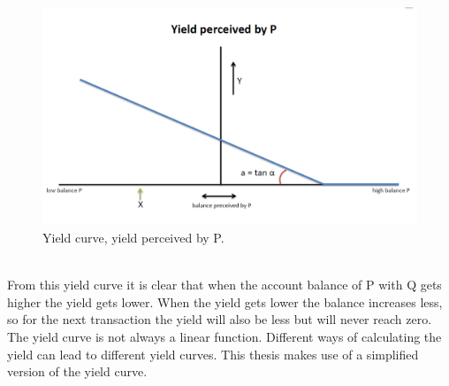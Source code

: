 \documentclass[twoside,openright]{uva-bachelor-thesis}
\begin{document}
\\
\begin{figure}[h!]
   \centering
    \includegraphics[scale=0.4]{YieldCurves/yieldcurve_P}
 \caption{Yield curve, yield perceived by P.}
\end{figure}
\\
From this yield curve it is clear that when the account balance of P with Q gets higher the yield gets lower.  When the yield gets lower the balance increases less, so for the next transaction the yield will also be less but will never reach zero.
The yield curve is not always a linear function. Different ways of calculating the yield can lead to different yield curves. This thesis makes use of a simplified version of the yield curve.
\end{document}

